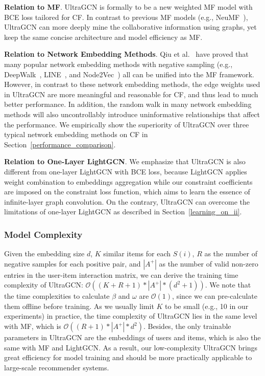 \documentclass[sigconf,authorversion]{acmart}
\begin{document}
\textbf{Relation to MF}. UltraGCN is formally to be a new weighted MF model with BCE loss tailored for CF. In contrast to previous MF models (e.g., NeuMF~\cite{NeuMF}), UltraGCN can more deeply mine the collaborative information using graphs, yet keep the same concise architecture and model efficiency as MF.

\textbf{Relation to Network Embedding Methods}. Qiu et al.~\cite{unify_network_embedding} have proved that many popular network embedding methods with negative sampling (e.g., DeepWalk~\cite{deepwalk}, LINE~\cite{LINE}, and Node2Vec~\cite{node2vec}) all can be unified into the MF framework. However, in contrast to these network embedding methods, the edge weights used in UltraGCN are more meaningful and reasonable for CF, and thus lead to much better performance. 
In addition, the random walk in many network embedding methods will also uncontrollably introduce uninformative relationships that affect the performance.
We empirically show the superiority of UltraGCN over three typical network embedding methods on CF in Section~\ref{performance_comparison}.

\textbf{Relation to One-Layer LightGCN}. We emphasize that UltraGCN is also different from one-layer LightGCN with BCE loss, because LightGCN applies weight combination to embeddings aggregation while our constraint coefficients are imposed on the constraint loss function, which aims to learn the essence of infinite-layer graph convolution. 
On the contrary, UltraGCN can overcome the limitations of one-layer LightGCN as described in Section~\ref{learning_on_ii}.
 






\subsubsection{Model Complexity}
\label{sec::complexity}
Given the embedding size $d$, $K$ similar items for each $S(i)$, $R$ as the number of negative samples for each positive pair, and $|A^{+}|$ as the number of valid non-zero entries in the user-item interaction matrix, we can derive the training time complexity of UltraGCN: $\mathcal{O}((K+R+1) * |A^{+}| * (d^2 + 1))$. We note that the time complexities to calculate $\beta$ and $\omega$ are  $\mathcal{O}(1)$, since we can pre-calculate them offline before training. As we usually limit $K$ to be small (e.g., 10 in our experiments) in practice, the time complexity of UltraGCN lies in the same level with MF, which is $\mathcal{O}((R + 1) * |A^{+}| * d^2)$. Besides, the only trainable parameters in UltraGCN are the embeddings of users and items, which is also the same with MF and LightGCN. As a result, our low-complexity UltraGCN brings great efficiency for model training and should be more practically applicable to large-scale recommender systems.
\end{document}
